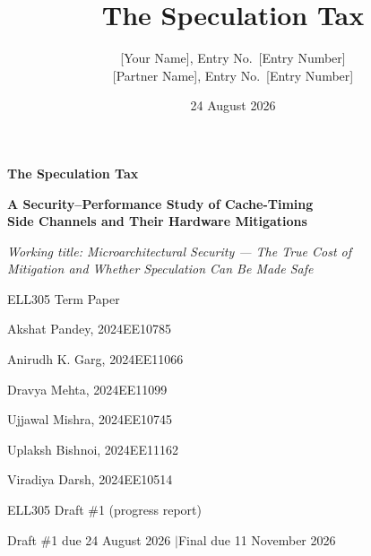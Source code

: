 \documentclass[11pt,a4paper]{article}
\title{The Speculation Tax}
\author{[Your Name], Entry No.\ [Entry Number] \\{} [Partner Name], Entry No.\ [Entry Number]}
\date{24 August 2026}
\begin{document}


\begin{titlepage}
\centering
\vspace*{3.2cm}
{\Huge\bfseries The Speculation Tax\par}
\vspace{0.5cm}
{\Large\bfseries A Security--Performance Study of Cache-Timing\\ Side Channels and Their Hardware Mitigations\par}
\vspace{1cm}
{\normalsize\itshape Working title: Microarchitectural Security --- The True Cost of\\ Mitigation and Whether Speculation Can Be Made Safe\par}

\vspace{2.2cm}
{\large ELL305 Term Paper\par}
\vspace{0.3cm}
{\large Akshat Pandey, 2024EE10785\par}
{\large Anirudh K. Garg, 2024EE11066\par}
{\large Dravya Mehta, 2024EE11099\par}
{\large Ujjawal Mishra, 2024EE10745\par}
{\large Uplaksh Bishnoi, 2024EE11162\par}
{\large Viradiya Darsh, 2024EE10514\par}

\vfill

{\large ELL305 \quad Draft \#1 (progress report)\par}
\vspace{0.2cm}
{\large Draft \#1 due 24 August 2026 \quad$\vert$\quad Final due 11 November 2026\par}
\vspace{2.5cm}
\end{titlepage}
\end{document}
